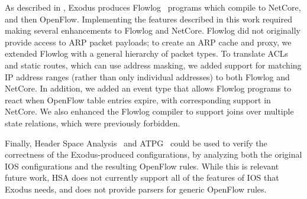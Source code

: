 As described in , Exodus produces
Flowlog~\cite{Nelson:2014flowlog} programs which compile to
NetCore, and then OpenFlow.
Implementing the features described in this work required making
several enhancements to Flowlog and NetCore.
Flowlog did not originally provide access to ARP packet payloads;
to create an ARP cache and proxy, we extended Flowlog with a
general hierarchy of packet types.
To translate ACLs and static routes, which can use address
masking, we added support for matching IP address ranges (rather than
only individual addresses) to both Flowlog and NetCore. In addition, we added
an event type that allows Flowlog programs to react when
OpenFlow table entries expire, with corresponding support in NetCore.
We also enhanced the Flowlog
compiler to support joins over multiple state relations, which were
previously forbidden.


Finally, Header Space Analysis~\cite{kazemian:nsdi12-hsa} and
ATPG~\cite{zeng12test}
could be used to verify the correctness of the Exodus-produced configurations,
by analyzing both the original IOS configurations and the resulting OpenFlow rules.
While this is relevant future work, HSA does not currently support 
all of the features of IOS that Exodus needs, and does not provide parsers for
generic OpenFlow rules.




